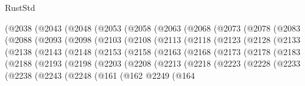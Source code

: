 \begin{lexlean}{RustStd}
\begin{coremodule}
{\begin{coremodule}
{{{{{{{{{{{{{{{{{{{{{{{{{{{{{{{{{{{{{{{{{{{{{{{{{{{{{{{{{{{{    (@2038
      (@2043
        (@2048
          (@2053
            (@2058
              (@2063
                (@2068
                  (@2073
                    (@2078
                      (@2083
                        (@2088
                          (@2093
                            (@2098
                              (@2103
                                (@2108
                                  (@2113
                                    (@2118
                                      (@2123
                                        (@2128
                                          (@2133
                                            (@2138
                                              (@2143
                                                (@2148
                                                  (@2153
                                                    (@2158
                                                      (@2163
                                                        (@2168
                                                          (@2173
                                                            (@2178
                                                              (@2183
                                                                (@2188
                                                                  (@2193
                                                                    (@2198
                                                                      (@2203
                                                                        (@2208
                                                                          (@2213
                                                                            (@2218
                                                                              (@2223
                                                                                (@2228
                                                                                  (@2233
                                                                                    (@2238
                                                                                      (@2243
                                                                                        (@2248
                                                                                          (@161
                                                                                            (@162
                                                                                              @2249
                                                                                              (@164
}}}}}}}}}}}}}}}}}}}}}}}}}}}}}}}}}}}}}}}}}}}}}}}}}}}}}}}}}}}}
\end{coremodule}}
\end{coremodule}
\end{lexlean}
